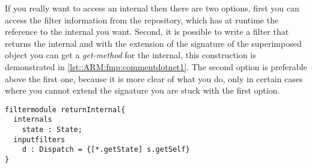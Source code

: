 If you really want to access an internal then there are two options, first you can access the filter information from the repository, which has at runtime the reference to the internal you want. 
Second, it is possible to write a filter that returns the internal and with the extension of the signature of the superimposed object you can get a \emph{get-method} for the internal, this construction is demonstrated in \autoref{lst::ARM:fmp:commentdotnet1}. 
The second option is preferable above the first one, because it is more clear of what you do, only in certain cases where you cannot extend the signature you are stuck with the first option.

\begin{lstlisting}[caption = {How to get hold of an internal}, label = lst::ARM:fmp:commentdotnet1,
style = listing, language=ComposeStar, float = tpb]
filtermodule returnInternal{
  internals
    state : State;
  inputfilters
    d : Dispatch = {[*.getState] s.getSelf}
}
\end{lstlisting}